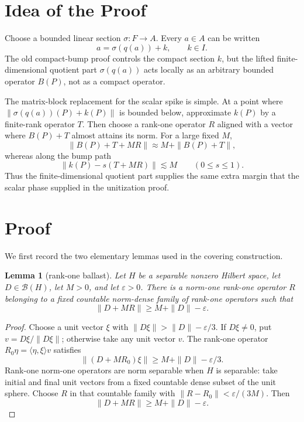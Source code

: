 \documentclass[11pt]{article}
\newtheorem{lemma}{Lemma}
\begin{document}
\section*{Idea of the Proof}

Choose a bounded linear section \(\sigma:F\to A\).  Every \(a\in A\) can be
written
\[
        a=\sigma(q(a))+k,\qquad k\in I.
\]
The old compact-bump proof controls the compact section \(k\), but the lifted
finite-dimensional quotient part \(\sigma(q(a))\) acts locally as an arbitrary
bounded operator \(B(P)\), not as a compact operator.

The matrix-block replacement for the scalar spike is simple.  At a point where
\(\|\sigma(q(a))(P)+k(P)\|\) is bounded below, approximate \(k(P)\) by a
finite-rank operator \(T\).  Then choose a rank-one operator \(R\) aligned with
a vector where \(B(P)+T\) almost attains its norm.  For a large fixed \(M\),
\[
        \|B(P)+T+MR\|\approx M+\|B(P)+T\|,
\]
whereas along the bump path
\[
        \|k(P)-s(T+MR)\|\lesssim M\qquad(0\le s\le1).
\]
Thus the finite-dimensional quotient part supplies the same extra margin that
the scalar phase supplied in the unitization proof.

\section*{Proof}

We first record the two elementary lemmas used in the covering construction.

\begin{lemma}[rank-one ballast]
\label{lem:ballast}
Let \(H\) be a separable nonzero Hilbert space, let \(D\in\mathcal B(H)\), let
\(M>0\), and let \(\varepsilon>0\).  There is a norm-one rank-one operator
\(R\) belonging to a fixed countable norm-dense family of rank-one operators
such that
\[
        \|D+MR\|\ge M+\|D\|-\varepsilon .
\]
\end{lemma}

\begin{proof}
Choose a unit vector \(\xi\) with
\(\|D\xi\|>\|D\|-\varepsilon/3\).  If \(D\xi\ne0\), put
\(v=D\xi/\|D\xi\|\); otherwise take any unit vector \(v\).  The rank-one
operator \(R_0\eta=\langle \eta,\xi\rangle v\) satisfies
\[
        \|(D+MR_0)\xi\|\ge M+\|D\|-\varepsilon/3.
\]
Rank-one norm-one operators are norm separable when \(H\) is separable: take
initial and final unit vectors from a fixed countable dense subset of the unit
sphere.  Choose \(R\) in that countable family with
\(\|R-R_0\|<\varepsilon/(3M)\).  Then
\[
        \|D+MR\|\ge M+\|D\|-\varepsilon .
\]
\end{proof}
\end{document}
